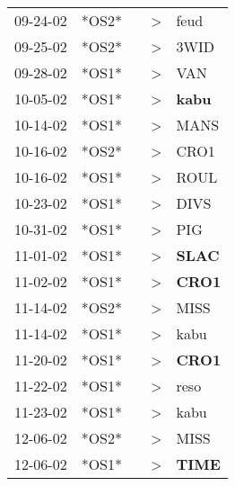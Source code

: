 \begin{supertabular}{p{0.07\textwidth}p{0.06\textwidth}p{0.02\textwidth}p{0.02\textwidth}p{0.06\textwidth}}
          09-24-02\textsuperscript{} &  *OS2* &   &     \textgreater &           feud\textsuperscript{} \\
          09-25-02\textsuperscript{} &  *OS2* &   &     \textgreater &           3WID\textsuperscript{} \\
          09-28-02\textsuperscript{} &  *OS1* &   &     \textgreater &            VAN\textsuperscript{} \\
          10-05-02\textsuperscript{} &  *OS1* &   &     \textgreater &  \textbf{kabu\textsuperscript{}} \\
          10-14-02\textsuperscript{} &  *OS1* &   &     \textgreater &           MANS\textsuperscript{} \\
          10-16-02\textsuperscript{} &  *OS2* &   &     \textgreater &           CRO1\textsuperscript{} \\
          10-16-02\textsuperscript{} &  *OS1* &   &     \textgreater &           ROUL\textsuperscript{} \\
          10-23-02\textsuperscript{} &  *OS1* &   &     \textgreater &           DIVS\textsuperscript{} \\
          10-31-02\textsuperscript{} &  *OS1* &   &     \textgreater &            PIG\textsuperscript{} \\
          11-01-02\textsuperscript{} &  *OS1* &   &     \textgreater &  \textbf{SLAC\textsuperscript{}} \\
          11-02-02\textsuperscript{} &  *OS1* &   &     \textgreater &  \textbf{CRO1\textsuperscript{}} \\
          11-14-02\textsuperscript{} &  *OS2* &   &     \textgreater &           MISS\textsuperscript{} \\
          11-14-02\textsuperscript{} &  *OS1* &   &     \textgreater &           kabu\textsuperscript{} \\
          11-20-02\textsuperscript{} &  *OS1* &   &     \textgreater &  \textbf{CRO1\textsuperscript{}} \\
          11-22-02\textsuperscript{} &  *OS1* &   &     \textgreater &           reso\textsuperscript{} \\
          11-23-02\textsuperscript{} &  *OS1* &   &     \textgreater &           kabu\textsuperscript{} \\
          12-06-02\textsuperscript{} &  *OS2* &   &     \textgreater &           MISS\textsuperscript{} \\
          12-06-02\textsuperscript{} &  *OS1* &   &     \textgreater &  \textbf{TIME\textsuperscript{}} \\

\end{supertabular}
